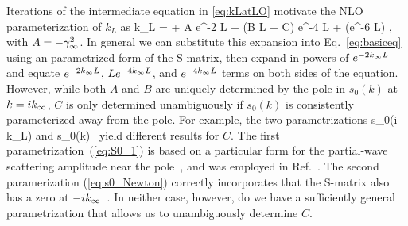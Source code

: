 	Iterations of the intermediate equation  in \eqref{eq:kLatLO} motivate the
	NLO parameterization of $k_L$ as
	\beq
	  k_L = \kinf + A e^{-2 \kinf L} + (B L + C) e^{-4 \kinf L}  +
		(e^{-6 \kinf L})
	  \;,
	  \label{eq:kLexpansion}
	\eeq
	with $A = -\gamma_\infty^2$.  In general we can substitute this expansion into
	Eq.~\eqref{eq:basiceq} using an parametrized form of the S-matrix,
	then expand in powers of $e^{-2 k_{\infty} L}$ and equate $e^{-2 k_{\infty} L}$,
	$L e^{-4 k_{\infty} L}$, and $e^{-4 k_{\infty} L}$ terms on both sides of the
	equation.  However, while both $A$ and $B$ are uniquely determined by
	the pole in $s_0(k)$ at $k=ik_{\infty}$, $C$ is only determined unambiguously if
	$s_0(k)$ is consistently parameterized away from the pole.  For
	example, the two parametrizations
	\beq
	\label{eq:S0_1}
	    s_0(i k_L) \approx {}
	\eeq
	and
	\beq
	  s_0(k) \approx {}\,
	  \label{eq:s0_Newton}
	\eeq
	yield different results for $C$. The first
	parametrization~(\ref{eq:S0_1}) is based on a particular form for the
	partial-wave scattering amplitude near the
	pole~\cite{taylor2006scattering}, and was employed in
	Ref.~\cite{More:2013rma}.  The second paramerization
	(\ref{eq:s0_Newton}) correctly incorporates that the S-matrix also has
	a zero at $-ik_{\infty}$~\cite{newton2002scattering}.  In neither case,
	however, do we have a sufficiently general parametrization that allows
	us to unambiguously determine $C$.

